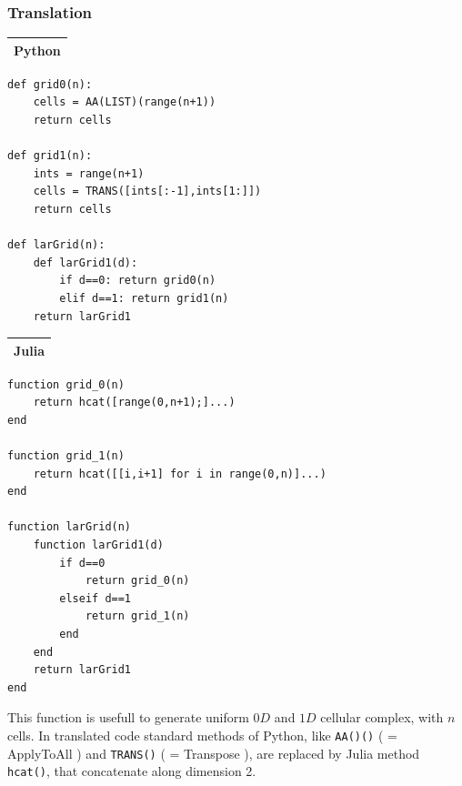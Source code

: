 \documentclass{article}
\begin{document}
\begin{flushleft} \small
\subsubsection{Translation}
\vspace{1ex}
\begin{center}
\begin{tabular}{|p{16cm}|}
\hline
\cellcolor[gray]{.9}Python\\
\hline
\end{tabular}
\end{center}
\begin{list}{}{} \item
\begin{Verbatim}[tabsize=4]
def grid0(n):
    cells = AA(LIST)(range(n+1))
    return cells

def grid1(n):
    ints = range(n+1)
    cells = TRANS([ints[:-1],ints[1:]])
    return cells

def larGrid(n):
    def larGrid1(d):
        if d==0: return grid0(n)
        elif d==1: return grid1(n)
    return larGrid1
\end{Verbatim}
\end{list}

\begin{center}
\begin{tabular}{|p{16cm}|}
\hline
\cellcolor[gray]{.9}Julia\\
\hline
\end{tabular}
\end{center}

\begin{list}{}{} \item
\begin{Verbatim}[tabsize=4]
function grid_0(n)
    return hcat([range(0,n+1);]...)
end

function grid_1(n)
    return hcat([[i,i+1] for i in range(0,n)]...)
end

function larGrid(n)
    function larGrid1(d)
        if d==0 
            return grid_0(n)
        elseif d==1 
            return grid_1(n) 
        end
    end
    return larGrid1
end
\end{Verbatim}
\end{list}
\end{flushleft}
\vspace{2ex}
This function is usefull to generate uniform $0D$ and $1D$ cellular complex, with $n$ cells.
In translated code standard methods of Python, like \texttt{AA()()} ( = ApplyToAll ) and \texttt{TRANS()} ( = Transpose ), are replaced by Julia method \texttt{hcat()}, that concatenate along dimension 2.
\vspace{2ex}
\end{document}
